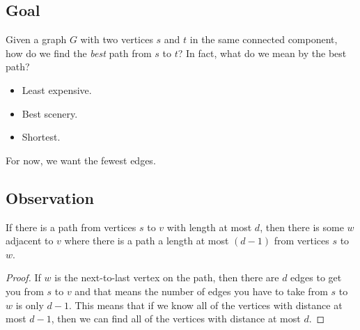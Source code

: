 \documentclass[letterpaper]{article}
\begin{document}
\subsection{Goal}
Given a graph $G$ with two vertices $s$ and $t$ in the same connected component, how do we find the \emph{best} path from $s$ to $t$? In fact, what do we mean by the best path? 
\begin{itemize}
    \item Least expensive. 
    \item Best scenery.
    \item Shortest.
\end{itemize}
For now, we want the fewest edges. 

\subsection{Observation}
\begin{proposition}
    If there is a path from vertices $s$ to $v$ with length at most $d$, then there is some $w$ adjacent to $v$ where there is a path a length at most $(d - 1)$ from vertices $s$ to $w$.
\end{proposition} 

\begin{mdframed}[]
    \begin{proof}
        If $w$ is the next-to-last vertex on the path, then there are $d$ edges to get you from $s$ to $v$ and that means the number of edges you have to take from $s$ to $w$ is only $d - 1$. This means that if we know all of the vertices with distance at most $d - 1$, then we can find all of the vertices with distance at most $d$.
    \end{proof}
\end{mdframed}
\end{document}

